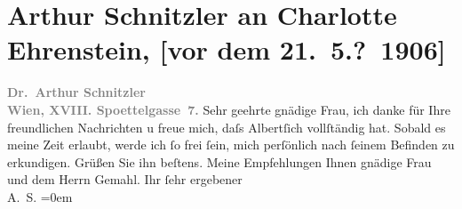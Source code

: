 

         
         \renewcommand{\erwaehntePersonen}{Personen: Charlotte Ehrenstein, Albert Ehrenstein, Alexander Ehrenstein}
         \renewcommand{\erwaehnteOrte}{Orte: Edmund-Weiß-Gasse, Wien}
         \renewcommand{\erwaehnteWerke}{}
               \section[Arthur Schnitzler an Charlotte Ehrenstein, {[}vor dem 21. 5.? 1906{]}]{ Arthur Schnitzler an Charlotte Ehrenstein, {[}vor dem
               21. 5.? 1906{]}}\nopagebreak{}\rehead{ }\begin{ledgroupsized}[t]{13cm}\normalsize\beginnumbering \toendnotes[C]{\smallbreak\pagebreak[2]} 
\toendnotes[C]{\smallbreak}\pstart
           \noindent{}{\pb}\textcolor{gray}{\textbf{Dr. Arthur Schnitzler}}{\\}\textcolor{gray}{\textbf{Wien, XVIII. Spoettelgasse 7.}}\pend
           \pstart
           Sehr geehrte gnädige Frau, ich danke für Ihre freundlichen
               Nachrichten u freue mich, daſs Albertſich vollſtändig \label{K_L01598_1v}\label{K_L01598_1h} hat. Sobald es meine Zeit erlaubt, werde ich ſo frei ſein, mich
               perſönlich nach ſeinem {\pb}Befinden zu erkundigen.\pend
           \pstart
           Grüßen Sie ihn beſtens. Meine Empfehlungen Ihnen gnädige Frau und dem Herrn Gemahl.\pend
           \pstart
           Ihr ſehr ergebener{\\[\baselineskip]}\spacefill\mbox{A. S.}\pend
           \leftskip=0em{}
         
         \endnumbering{}\end{ledgroupsized}  \newcommand{\dateiname}{L01598}\newcommand{\titel}{Arthur Schnitzler an Charlotte Ehrenstein, [vor dem 21. 5.? 1906]}\newcommand{\editorInnen}{Martin Anton Müller und Gerd-Hermann Susen}
      